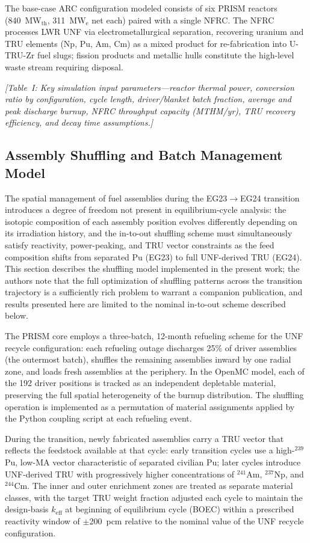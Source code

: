 \documentclass[10pt,twoside]{article}
\newcommand{\placeholder}[1]{%
  \textcolor{placeholder}{\textit{[#1]}}}
\begin{document}
The base-case ARC configuration modeled consists of six PRISM reactors
(840~MW$_\text{th}$, 311~MW$_\text{e}$ net each) paired with a single NFRC.
The NFRC processes LWR UNF via electrometallurgical separation, recovering
uranium and TRU elements (Np, Pu, Am, Cm) as a mixed product for
re-fabrication into U-TRU-Zr fuel slugs; fission products and metallic hulls
constitute the high-level waste stream requiring disposal.

\placeholder{Table~I: Key simulation input parameters---reactor thermal power,
  conversion ratio by configuration, cycle length, driver/blanket batch fraction,
  average and peak discharge burnup, NFRC throughput capacity (MTHM/yr),
  TRU recovery efficiency, and decay time assumptions.}

\subsection{Assembly Shuffling and Batch Management Model}
\label{sec:shuffling}

The spatial management of fuel assemblies during the EG23$\rightarrow$EG24
transition introduces a degree of freedom not present in equilibrium-cycle
analysis: the isotopic composition of each assembly position evolves
differently depending on its irradiation history, and the in-to-out shuffling
scheme must simultaneously satisfy reactivity, power-peaking, and TRU
vector constraints as the feed composition shifts from separated Pu
(EG23) to full UNF-derived TRU (EG24).  This section describes the
shuffling model implemented in the present work; the authors note that
the full optimization of shuffling patterns across the transition
trajectory is a sufficiently rich problem to warrant a companion
publication, and results presented here are limited to the nominal
in-to-out scheme described below.

The PRISM core employs a three-batch, 12-month refueling scheme for
the UNF recycle configuration: each refueling outage discharges
25\% of driver assemblies (the outermost batch), shuffles the remaining
assemblies inward by one radial zone, and loads fresh assemblies at
the periphery.  In the OpenMC model, each of the 192 driver positions
is tracked as an independent depletable material, preserving the
full spatial heterogeneity of the burnup distribution.  The shuffling
operation is implemented as a permutation of material assignments
applied by the Python coupling script at each refueling event.

During the transition, newly fabricated assemblies carry a TRU vector
that reflects the feedstock available at that cycle: early transition
cycles use a high-$^{239}$Pu, low-MA vector characteristic of
separated civilian Pu; later cycles introduce UNF-derived TRU with
progressively higher concentrations of $^{241}$Am, $^{237}$Np, and
$^{244}$Cm.  The inner and outer enrichment zones are treated as
separate material classes, with the target TRU weight fraction
adjusted each cycle to maintain the design-basis $k_\text{eff}$ at
beginning of equilibrium cycle (BOEC) within a prescribed reactivity
window of $\pm$200~pcm relative to the nominal value of the UNF
recycle configuration.
\end{document}

